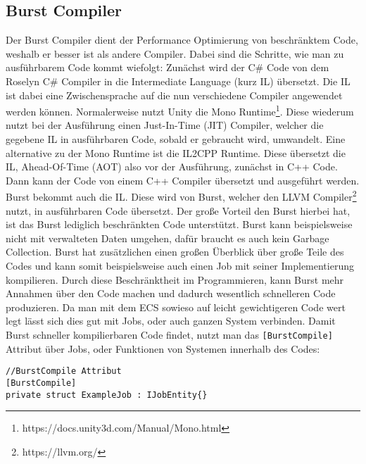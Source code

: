 \subsection{Burst Compiler} \label{burst}
Der Burst Compiler dient der Performance Optimierung von beschränktem Code, weshalb er besser ist als andere Compiler. Dabei sind die Schritte, wie man zu ausführbarem Code kommt wiefolgt: Zunächst wird der C\# Code von dem Roselyn C\# Compiler in die Intermediate Language (kurz IL) übersetzt. Die IL ist dabei eine Zwischensprache auf die nun verschiedene Compiler angewendet werden können. Normalerweise nutzt Unity die Mono Runtime\footnote{https://docs.unity3d.com/Manual/Mono.html}. Diese wiederum nutzt bei der Ausführung einen Just-In-Time (JIT) Compiler, welcher die gegebene IL in ausführbaren Code, sobald er gebraucht wird, umwandelt. Eine alternative zu der Mono Runtime ist die IL2CPP Runtime. Diese übersetzt die IL, Ahead-Of-Time (AOT) also vor der Ausführung, zunächst in C++ Code. Dann kann der Code von einem C++ Compiler übersetzt und ausgeführt werden.\\
Burst bekommt auch die IL. Diese wird von Burst, welcher den LLVM Compiler\footnote{https://llvm.org/} nutzt, in ausführbaren Code übersetzt. Der große Vorteil den Burst hierbei hat, ist das Burst lediglich beschränkten Code unterstützt. Burst kann beispielsweise nicht mit  verwalteten Daten umgehen, dafür braucht es auch kein Garbage Collection. Burst hat zusätzlichen einen großen Überblick über große Teile des Codes und kann somit beispielsweise auch einen Job mit seiner Implementierung kompilieren. Durch diese Beschränktheit im Programmieren, kann Burst mehr Annahmen über den Code machen und dadurch wesentlich schnelleren Code produzieren. Da man mit dem ECS sowieso auf leicht gewichtigeren Code wert legt lässt sich dies gut mit Jobs, oder auch ganzen System verbinden. Damit Burst schneller kompilierbaren Code findet, nutzt man das \texttt{[BurstCompile]} Attribut über Jobs, oder Funktionen von Systemen innerhalb des Codes:
\begin{lstlisting}[style=code, caption={BurstCompile Attribut, um Burst zu verwenden}]
//BurstCompile Attribut
[BurstCompile]
private struct ExampleJob : IJobEntity{}
\end{lstlisting}
